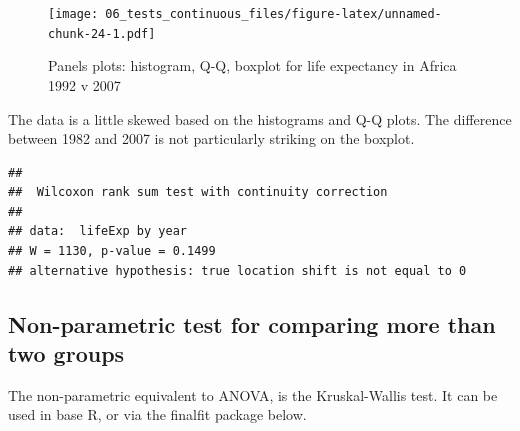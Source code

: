 \documentclass[12pt,]{krantz}
\makeatletter
\newenvironment{Shaded}{\begin{snugshade}}{\end{snugshade}}
\newcommand{\DataTypeTok}[1]{\textcolor[rgb]{0.13,0.29,0.53}{#1}}
\newcommand{\DecValTok}[1]{\textcolor[rgb]{0.00,0.00,0.81}{#1}}
\newcommand{\KeywordTok}[1]{\textcolor[rgb]{0.13,0.29,0.53}{\textbf{#1}}}
\newcommand{\NormalTok}[1]{#1}
\newcommand{\OperatorTok}[1]{\textcolor[rgb]{0.81,0.36,0.00}{\textbf{#1}}}
\newcommand{\StringTok}[1]{\textcolor[rgb]{0.31,0.60,0.02}{#1}}
\newenvironment{kframe}{%
\medskip{}
\setlength{\fboxsep}{.8em}
 \def\at@end@of@kframe{}%
 \ifinner\ifhmode%
  \def\at@end@of@kframe{\end{minipage}}%
  \begin{minipage}{\columnwidth}%
 \fi\fi%
 \def\FrameCommand##1{\hskip\@totalleftmargin \hskip-\fboxsep
 \colorbox{shadecolor}{##1}\hskip-\fboxsep
     \hskip-\linewidth \hskip-\@totalleftmargin \hskip\columnwidth}%
 \MakeFramed {\advance\hsize-\width
   \@totalleftmargin\z@ \linewidth\hsize
   \@setminipage}}%
 {\par\unskip\endMakeFramed%
 \at@end@of@kframe}
\renewenvironment{Shaded}{\begin{kframe}}{\end{kframe}}
\theoremstyle{definition}
\theoremstyle{definition}
\theoremstyle{definition}
\theoremstyle{remark}
\makeatother
\begin{document}
\begin{figure}
\centering
\texttt{[image: 06\_tests\_continuous\_files/figure-latex/unnamed-chunk-24-1.pdf]}
\caption{\label{fig:unnamed-chunk-24}Panels plots: histogram, Q-Q, boxplot
for life expectancy in Africa 1992 v 2007}
\end{figure}

 
 
 
 

The data is a little skewed based on the histograms and Q-Q plots. The
difference between 1982 and 2007 is not particularly striking on the
boxplot.

\begin{Shaded}
\end{Shaded}

\begin{verbatim}
## 
##  Wilcoxon rank sum test with continuity correction
## 
## data:  lifeExp by year
## W = 1130, p-value = 0.1499
## alternative hypothesis: true location shift is not equal to 0
\end{verbatim}


\hypertarget{non-parametric-test-for-comparing-more-than-two-groups}{%
\subsection{Non-parametric test for comparing more than two
groups}\label{non-parametric-test-for-comparing-more-than-two-groups}}


The non-parametric equivalent to ANOVA, is the Kruskal-Wallis test. It
can be used in base R, or via the finalfit package below.

\begin{Shaded}
\end{Shaded}
\end{document}
